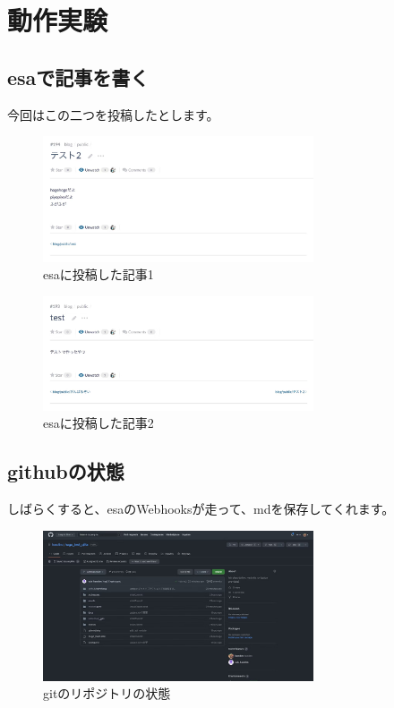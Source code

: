 \chapter{動作実験}

\section{esaで記事を書く}
  今回はこの二つを投稿したとします。

  \begin{figure}[H]
    \centering
    \includegraphics[width=8cm]{./image/02-chap9/esa-post-1.png}
    \caption{esaに投稿した記事1}
    \label{chap9-esa-post-1-image}
  \end{figure}

  \begin{figure}[H]
    \centering
    \includegraphics[width=8cm]{./image/02-chap9/esa-post-2.png}
    \caption{esaに投稿した記事2}
    \label{chap9-esa-post-2-image}
  \end{figure}

\section{githubの状態}

  しばらくすると、esaのWebhooksが走って、mdを保存してくれます。

  \begin{figure}[H]
    \centering
    \includegraphics[width=8cm]{./image/02-chap9/git-repo.png}
    \caption{gitのリポジトリの状態}
    \label{chap9-git-repo-image}
  \end{figure}

